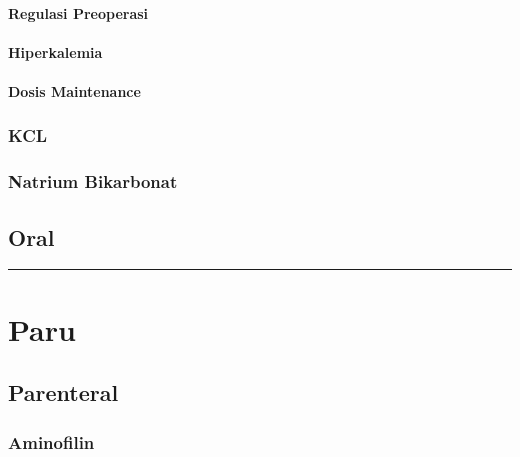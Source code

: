 \documentclass[
]{book}
\begin{document}
\hypertarget{regulasi-preoperasi}{%
\paragraph{Regulasi Preoperasi}\label{regulasi-preoperasi}}

\hypertarget{hiperkalemia-1}{%
\paragraph{Hiperkalemia}\label{hiperkalemia-1}}

\hypertarget{dosis-maintenance}{%
\paragraph{Dosis Maintenance}\label{dosis-maintenance}}

\hypertarget{kcl}{%
\subsubsection{KCL}\label{kcl}}

\hypertarget{natrium-bikarbonat}{%
\subsubsection{Natrium Bikarbonat}\label{natrium-bikarbonat}}

\hypertarget{oral}{%
\subsection{Oral}\label{oral}}

\begin{center}\rule{0.5\linewidth}{0.5pt}\end{center}

\hypertarget{paru-1}{%
\section{Paru}\label{paru-1}}

\hypertarget{parenteral-1}{%
\subsection{Parenteral}\label{parenteral-1}}

\hypertarget{aminofilin}{%
\subsubsection{Aminofilin}\label{aminofilin}}
\end{document}
